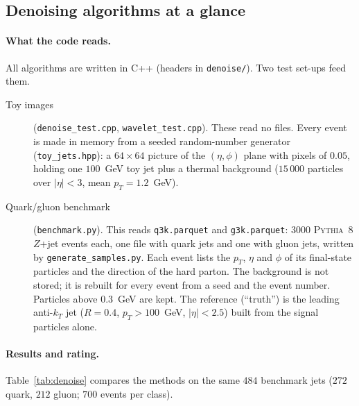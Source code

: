
\subsection{Denoising algorithms at a glance}

\paragraph{What the code reads.}
All algorithms are written in C++ (headers in \texttt{denoise/}). Two test
set-ups feed them.
\begin{description}
  \item[Toy images] (\texttt{denoise\_test.cpp}, \texttt{wavelet\_test.cpp}).
    These read no files. Every event is made in memory from a seeded
    random-number generator (\texttt{toy\_jets.hpp}): a $64\times64$ picture of
    the $(\eta,\phi)$ plane with pixels of $0.05$, holding one $100$~GeV toy jet
    plus a thermal background ($15\,000$ particles over $|\eta|<3$, mean
    $p_T=1.2$~GeV).
  \item[Quark/gluon benchmark] (\texttt{benchmark.py}).
    This reads \texttt{q3k.parquet} and \texttt{g3k.parquet}: $3000$
    \textsc{Pythia}~8 $Z$+jet events each, one file with quark jets and one with
    gluon jets, written by \texttt{generate\_samples.py}. Each event lists the
    $p_T$, $\eta$ and $\phi$ of its final-state particles and the direction of
    the hard parton. The background is not stored; it is rebuilt for every event
    from a seed and the event number. Particles above $0.3$~GeV are kept. The
    reference (``truth'') is the leading anti-$k_T$ jet ($R=0.4$,
    $p_T>100$~GeV, $|\eta|<2.5$) built from the signal particles alone.
\end{description}

\paragraph{Results and rating.}
Table~\ref{tab:denoise} compares the methods on the same $484$ benchmark jets
($272$ quark, $212$ gluon; $700$ events per class).

